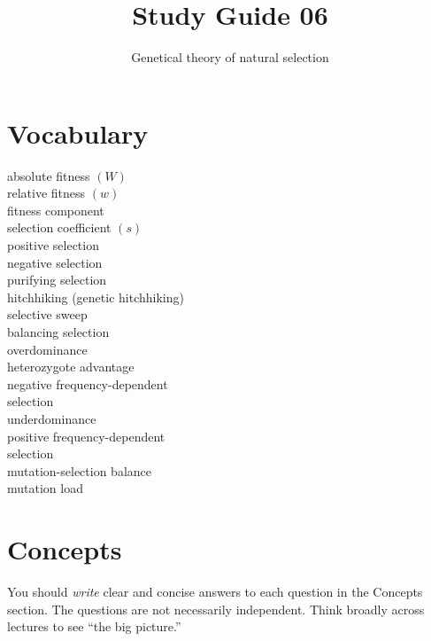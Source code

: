 \documentclass[letterpaper]{tufte-handout}
\title{Study Guide 06\hfill}
\author{Genetical theory of natural selection}
\date{} %
\begin{document}
\maketitle	%

\section{Vocabulary}

\begin{multicols}{2}
absolute fitness $\left(W\right)$ \\
relative fitness $\left(w\right)$ \\
fitness component \\
selection coefficient $\left(s\right)$\\
positive selection \\
negative selection \\
purifying selection \\
hitchhiking (genetic hitchhiking) \\
selective sweep \\
balancing selection \\
overdominance \\
heterozygote advantage \\
negative frequency-dependent \\
  \quad selection\\
underdominance \\
positive frequency-dependent \\
  \quad selection \\
mutation-selection balance \\
mutation load
\end{multicols}


\section{Concepts}

You should \emph{write} clear and concise answers to each question in the Concepts section.  The questions are not necessarily independent.  Think broadly across lectures to see ``the big picture.'' 
\end{document}
